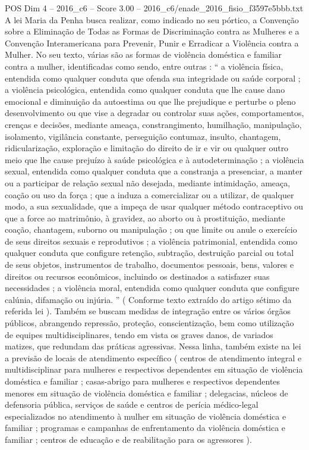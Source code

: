 \begin{textsample}{POS Dim 4 – 2016\_c6 – Score 3.00 – 2016\_c6/enade\_2016\_fisio\_f3597e5bbb.txt}
A lei Maria da Penha busca realizar, como indicado no seu pórtico, a Convenção sobre a Eliminação de Todas as Formas de Discriminação contra as Mulheres e a Convenção Interamericana para Prevenir, Punir e Erradicar a Violência contra a Mulher.
No seu texto, várias são as formas de violência doméstica e familiar contra a mulher, identificadas como sendo, entre outras : “ a violência física, entendida como qualquer conduta que ofenda sua integridade ou saúde corporal ; a violência psicológica, entendida como qualquer conduta que lhe cause dano emocional e diminuição da autoestima ou que lhe prejudique e perturbe o pleno desenvolvimento ou que vise a degradar ou controlar suas ações, comportamentos, crenças e decisões, mediante ameaça, constrangimento, humilhação, manipulação, isolamento, vigilância constante, perseguição contumaz, insulto, chantagem, ridicularização, exploração e limitação do direito de ir e vir ou qualquer outro meio que lhe cause prejuízo à saúde psicológica e à autodeterminação ; a violência sexual, entendida como qualquer conduta que a constranja a presenciar, a manter ou a participar de relação sexual não desejada, mediante intimidação, ameaça, coação ou uso da força ; que a induza a comercializar ou a utilizar, de qualquer modo, a sua sexualidade, que a impeça de usar qualquer método contraceptivo ou que a force ao matrimônio, à gravidez, ao aborto ou à prostituição, mediante coação, chantagem, suborno ou manipulação ; ou que limite ou anule o exercício de seus direitos sexuais e reprodutivos ; a violência patrimonial, entendida como qualquer conduta que configure retenção, subtração, destruição parcial ou total de seus objetos, instrumentos de trabalho, documentos pessoais, bens, valores e direitos ou recursos econômicos, incluindo os destinados a satisfazer suas necessidades ; a violência moral, entendida como qualquer conduta que configure calúnia, difamação ou injúria. ” ( Conforme texto extraído do artigo sétimo da referida lei ).
Também se buscam medidas de integração entre os vários órgãos públicos, abrangendo repressão, proteção, conscientização, bem como utilização de equipes multidisciplinares, tendo em vista os graves danos, de variados matizes, que redundam das práticas agressivas.
Nessa linha, também existe na lei a previsão de locais de atendimento específico ( centros de atendimento integral e multidisciplinar para mulheres e respectivos dependentes em situação de violência doméstica e familiar ; casas-abrigo para mulheres e respectivos dependentes menores em situação de violência doméstica e familiar ; delegacias, núcleos de defensoria pública, serviços de saúde e centros de perícia médico-legal especializados no atendimento à mulher em situação de violência doméstica e familiar ; programas e campanhas de enfrentamento da violência doméstica e familiar ; centros de educação e de reabilitação para os agressores ).

\end{textsample}
